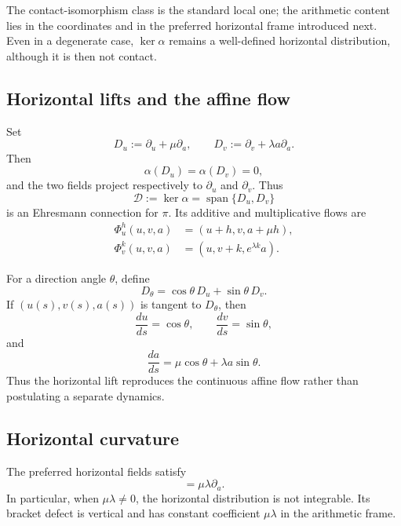 The contact-isomorphism class is the standard local one; the arithmetic content
lies in the coordinates and in the preferred horizontal frame introduced
next.  Even in a degenerate case, \(\ker\alpha\) remains a well-defined
horizontal distribution, although it is then not contact.

\subsection{Horizontal lifts and the affine flow}

Set
\begin{equation}
    D_u:=\partial_u+\mu\partial_a,
    \qquad
    D_v:=\partial_v+\lambda a\partial_a.
    \label{eq:horizontal-arithmetic-fields}
\end{equation}
Then
\[
    \alpha(D_u)=\alpha(D_v)=0,
\]
and the two fields project respectively to \(\partial_u\) and \(\partial_v\).
Thus
\[
    \mathcal D:=\ker\alpha
       =\operatorname{span}\{D_u,D_v\}
\]
is an Ehresmann connection for \(\pi\).  Its additive and multiplicative flows
are
\begin{align}
    \Phi_u^h(u,v,a)&=(u+h,v,a+\mu h),
       \label{eq:additive-horizontal-flow}\\
    \Phi_v^k(u,v,a)&=(u,v+k,e^{\lambda k}a).
       \label{eq:multiplicative-horizontal-flow}
\end{align}

For a direction angle \(\theta\), define
\[
    D_\theta=\cos\theta\,D_u+\sin\theta\,D_v.
\]
If \((u(s),v(s),a(s))\) is tangent to \(D_\theta\), then
\[
    \frac{du}{ds}=\cos\theta,
    \qquad
    \frac{dv}{ds}=\sin\theta,
\]
and
\begin{equation}
    \frac{da}{ds}
       =\mu\cos\theta+\lambda a\sin\theta.
    \label{eq:contact-realizes-affine-flow}
\end{equation}
Thus the horizontal lift reproduces the continuous affine flow rather than
postulating a separate dynamics.

\subsection{Horizontal curvature}

\begin{theorem}
\label{thm:contact-curvature}
The preferred horizontal fields satisfy
\begin{equation}
    [D_u,D_v]=\mu\lambda\partial_a.
    \label{eq:horizontal-curvature-bracket}
\end{equation}
In particular, when \(\mu\lambda\ne0\), the horizontal distribution is not
integrable.  Its bracket defect is vertical and has constant coefficient
\(\mu\lambda\) in the arithmetic frame.
\end{theorem}

